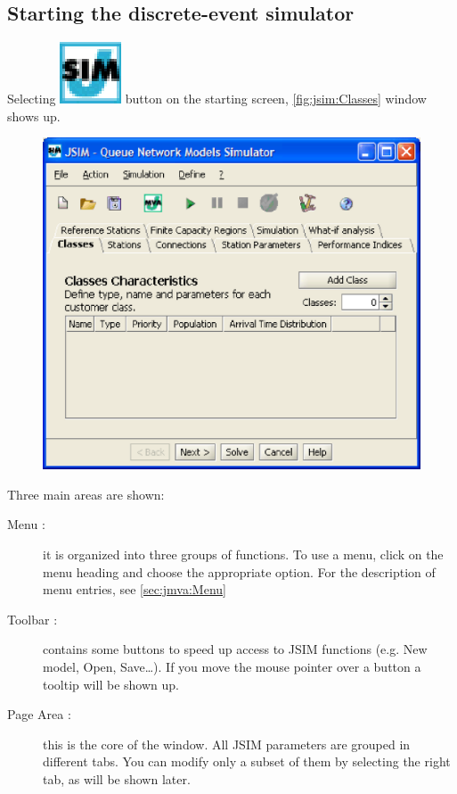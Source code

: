 \subsection{Starting the discrete-event simulator}
Selecting \includegraphics[scale=.5]{img/JSIMIcon.eps} button on the
starting screen, \autoref{fig:jsim:Classes} window shows up.
\begin{figure}[htbp]
    \begin{center}
        \includegraphics[scale=.5]{img/jsim/define_class1.eps}
    \end{center}
    \caption{}
    \label{fig:jsim:Classes}
\end{figure}
Three main areas are shown:
\begin{description}
\item[Menu :] it is organized into three groups of functions. To use a
menu, click on the menu heading and choose the appropriate option.
For the description of menu entries, see \autoref{sec:jmva:Menu}
\item[Toolbar :] contains some buttons to speed up access to JSIM functions
(e.g. New model, Open, Save\dots ). If you move the mouse pointer over a button a tooltip will be shown up.
\item[Page Area :] this is the core of the window. All JSIM parameters are grouped in
different tabs. You can modify only a subset of them by selecting
the right tab, as will be shown later.
\end{description}

